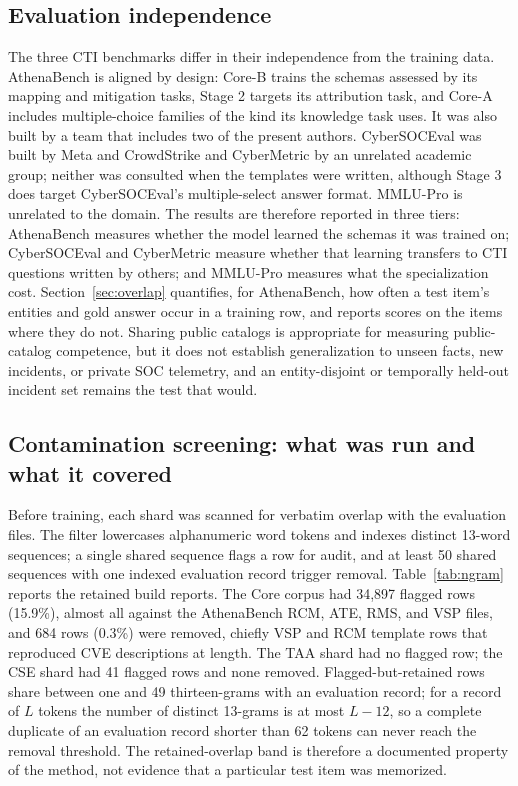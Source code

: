 \documentclass[preprint,12pt,authoryear]{elsarticle}
\begin{document}
\subsection{Evaluation independence}\label{sec:independence}
The three CTI benchmarks differ in their independence from the training data. AthenaBench is aligned by design: Core-B trains the schemas assessed by its mapping and mitigation tasks, Stage 2 targets its attribution task, and Core-A includes multiple-choice families of the kind its knowledge task uses. It was also built by a team that includes two of the present authors. CyberSOCEval was built by Meta and CrowdStrike and CyberMetric by an unrelated academic group; neither was consulted when the templates were written, although Stage 3 does target CyberSOCEval's multiple-select answer format. MMLU-Pro is unrelated to the domain. The results are therefore reported in three tiers: AthenaBench measures whether the model learned the schemas it was trained on; CyberSOCEval and CyberMetric measure whether that learning transfers to CTI questions written by others; and MMLU-Pro measures what the specialization cost. Section~\ref{sec:overlap} quantifies, for AthenaBench, how often a test item's entities and gold answer occur in a training row, and reports scores on the items where they do not. Sharing public catalogs is appropriate for measuring public-catalog competence, but it does not establish generalization to unseen facts, new incidents, or private SOC telemetry, and an entity-disjoint or temporally held-out incident set remains the test that would.

\subsection{Contamination screening: what was run and what it covered}\label{sec:contamination}
Before training, each shard was scanned for verbatim overlap with the evaluation files. The filter lowercases alphanumeric word tokens and indexes distinct 13-word sequences; a single shared sequence flags a row for audit, and at least 50 shared sequences with one indexed evaluation record trigger removal. Table~\ref{tab:ngram} reports the retained build reports. The Core corpus had 34,897 flagged rows (15.9\%), almost all against the AthenaBench RCM, ATE, RMS, and VSP files, and 684 rows (0.3\%) were removed, chiefly VSP and RCM template rows that reproduced CVE descriptions at length. The TAA shard had no flagged row; the CSE shard had 41 flagged rows and none removed. Flagged-but-retained rows share between one and 49 thirteen-grams with an evaluation record; for a record of $L$ tokens the number of distinct 13-grams is at most $L-12$, so a complete duplicate of an evaluation record shorter than 62 tokens can never reach the removal threshold. The retained-overlap band is therefore a documented property of the method, not evidence that a particular test item was memorized.
\end{document}
